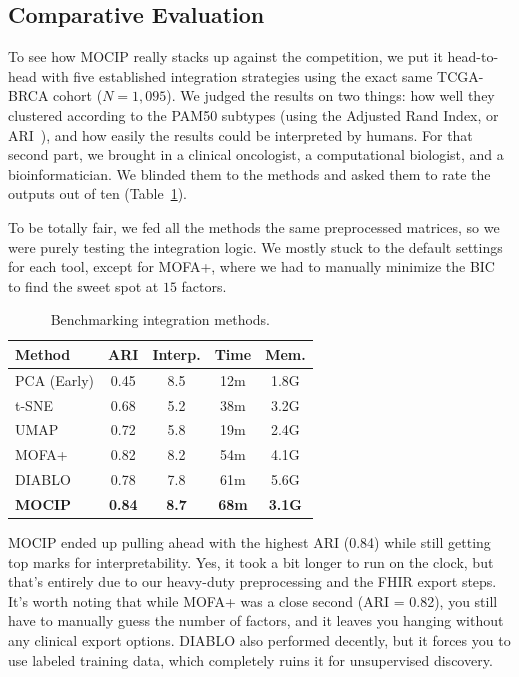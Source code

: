\documentclass[conference,flushend]{iaria} %
\begin{document}
\subsection{Comparative Evaluation}
To see how MOCIP really stacks up against the competition, we put it head-to-head with five established integration strategies using the exact same TCGA-BRCA cohort ($N=1{,}095$). We judged the results on two things: how well they clustered according to the PAM50 subtypes (using the Adjusted Rand Index, or ARI~\cite{wang2021evaluation}), and how easily the results could be interpreted by humans. For that second part, we brought in a clinical oncologist, a computational biologist, and a bioinformatician. We blinded them to the methods and asked them to rate the outputs out of ten (Table~\ref{tab:benchmark}).

To be totally fair, we fed all the methods the same preprocessed matrices, so we were purely testing the integration logic. We mostly stuck to the default settings for each tool, except for MOFA+, where we had to manually minimize the BIC to find the sweet spot at $15$ factors.

\begin{table}[H]
\caption{Benchmarking integration methods.}\label{tab:benchmark}
\centering
\scriptsize
\setlength{\tabcolsep}{2pt}
\begin{tabular}{l c c c c}
\toprule
\textbf{Method} & \textbf{ARI} & \textbf{Interp.} & \textbf{Time} & \textbf{Mem.} \\
\midrule
PCA (Early)      & 0.45 & 8.5 & 12m & 1.8G \\
t-SNE            & 0.68 & 5.2 & 38m & 3.2G \\
UMAP             & 0.72 & 5.8 & 19m & 2.4G \\
MOFA+            & 0.82 & 8.2 & 54m & 4.1G \\
DIABLO           & 0.78 & 7.8 & 61m & 5.6G \\
\midrule
\textbf{MOCIP}   & \textbf{0.84} & \textbf{8.7} & \textbf{68m} & \textbf{3.1G} \\
\bottomrule
\end{tabular}
\end{table}

MOCIP ended up pulling ahead with the highest ARI (0.84) while still getting top marks for interpretability. Yes, it took a bit longer to run on the clock, but that's entirely due to our heavy-duty preprocessing and the FHIR export steps. It's worth noting that while MOFA+ was a close second (ARI = 0.82), you still have to manually guess the number of factors, and it leaves you hanging without any clinical export options. DIABLO also performed decently, but it forces you to use labeled training data, which completely ruins it for unsupervised discovery.
\end{document}
